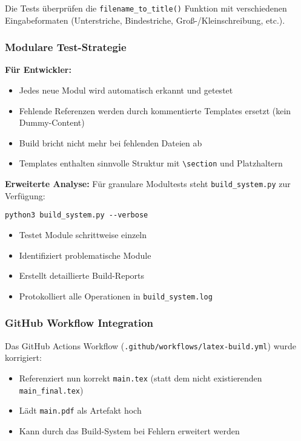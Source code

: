 Die Tests überprüfen die \texttt{filename\_to\_title()} Funktion mit verschiedenen Eingabeformaten (Unterstriche, Bindestriche, Groß-/Kleinschreibung, etc.).

\hypertarget{modulare-test-strategie}{%
\subsubsection{Modulare Test-Strategie}\label{modulare-test-strategie}}

\textbf{Für Entwickler:}
\begin{itemize}
\tightlist
\item
  Jedes neue Modul wird automatisch erkannt und getestet
\item
  Fehlende Referenzen werden durch kommentierte Templates ersetzt (kein Dummy-Content)
\item
  Build bricht nicht mehr bei fehlenden Dateien ab
\item
  Templates enthalten sinnvolle Struktur mit \texttt{\textbackslash{}section} und Platzhaltern
\end{itemize}

\textbf{Erweiterte Analyse:}
Für granulare Modultests steht \texttt{build\_system.py} zur Verfügung:
\begin{verbatim}
python3 build_system.py --verbose
\end{verbatim}
\begin{itemize}
\tightlist
\item
  Testet Module schrittweise einzeln
\item
  Identifiziert problematische Module
\item
  Erstellt detaillierte Build-Reports
\item
  Protokolliert alle Operationen in \texttt{build\_system.log}
\end{itemize}

\hypertarget{github-workflow-integration}{%
\subsubsection{GitHub Workflow Integration}\label{github-workflow-integration}}

Das GitHub Actions Workflow (\texttt{.github/workflows/latex-build.yml}) wurde korrigiert:
\begin{itemize}
\tightlist
\item
  Referenziert nun korrekt \texttt{main.tex} (statt dem nicht existierenden \texttt{main\_final.tex})
\item
  Lädt \texttt{main.pdf} als Artefakt hoch
\item
  Kann durch das Build-System bei Fehlern erweitert werden
\end{itemize}

